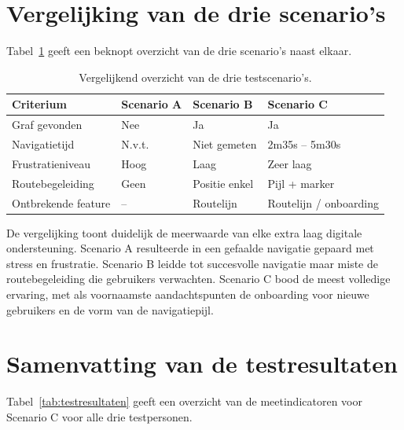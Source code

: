 \section{Vergelijking van de drie scenario's}

Tabel~\ref{tab:scenariovergelijking} geeft een beknopt overzicht van de drie
scenario's naast elkaar.

\begin{table}[h]
    \centering
    \caption[Vergelijking testscenario's]{Vergelijkend overzicht van de drie
        testscenario's.}
    \label{tab:scenariovergelijking}
    \renewcommand{\arraystretch}{1.4}
    \begin{tabular}{p{3cm} p{3.5cm} p{3.5cm} p{3cm}}
        \hline
        \textbf{Criterium} & \textbf{Scenario A} & \textbf{Scenario B} & \textbf{Scenario C} \\
        \hline
        Graf gevonden & Nee & Ja & Ja \\
        \hline
        Navigatietijd & N.v.t. & Niet gemeten & 2m35s -- 5m30s \\
        \hline
        Frustratieniveau & Hoog & Laag & Zeer laag \\
        \hline
        Routebegeleiding & Geen & Positie enkel & Pijl + marker \\
        \hline
        Ontbrekende feature & -- & Routelijn & Routelijn / onboarding \\
        \hline
    \end{tabular}
\end{table}

De vergelijking toont duidelijk de meerwaarde van elke extra laag digitale
ondersteuning. Scenario A resulteerde in een gefaalde navigatie gepaard met
stress en frustratie. Scenario B leidde tot succesvolle navigatie maar miste
de routebegeleiding die gebruikers verwachten. Scenario C bood de meest
volledige ervaring, met als voornaamste aandachtspunten de onboarding voor
nieuwe gebruikers en de vorm van de navigatiepijl.

\section{Samenvatting van de testresultaten}

Tabel~\ref{tab:testresultaten} geeft een overzicht van de meetindicatoren voor
Scenario C voor alle drie testpersonen.

